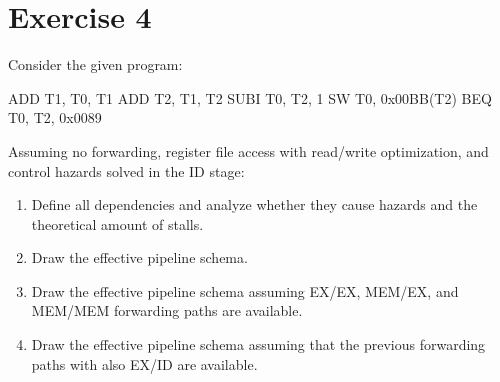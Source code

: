 \section{Exercise 4}

Consider the given program:
\begin{verbnobox}[\verbarg]
ADD T1, T0, T1
ADD T2, T1, T2
SUBI T0, T2, 1
SW T0, 0x00BB(T2)
BEQ T0, T2, 0x0089   
\end{verbnobox}
Assuming no forwarding, register file access with read/write optimization, and control hazards solved in the ID stage:
\begin{enumerate}
    \item Define all dependencies and analyze whether they cause hazards and the theoretical amount of stalls.
    \item Draw the effective pipeline schema. 
    \item Draw the effective pipeline schema assuming EX/EX, MEM/EX, and MEM/MEM forwarding paths are available. 
    \item Draw the effective pipeline schema assuming that the previous forwarding paths with also EX/ID are available.
\end{enumerate}

